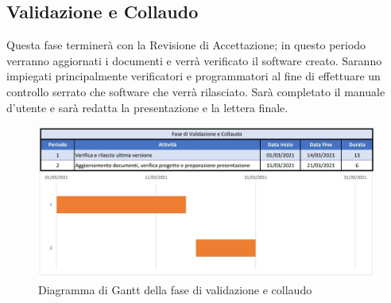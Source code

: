 \documentclass[../piano_di_progetto.tex]{subfiles}
\begin{document}
\subsection{Validazione e Collaudo}%
\label{sub:valid_coll}
Questa fase terminerà con la Revisione di Accettazione; in questo periodo verranno aggiornati i documenti e verrà verificato il software creato. Saranno impiegati principalmente verificatori e programmatori al fine di effettuare un controllo serrato che software che verrà rilasciato. Sarà completato il manuale d'utente e sarà redatta la presentazione e la lettera finale. 

\begin{figure}[H]
\centering

\includegraphics[width=12cm]{componenti/img/fase_valid_collaudo}

\caption{Diagramma di Gantt della fase di validazione e collaudo}
\end{figure}
\end{document}
